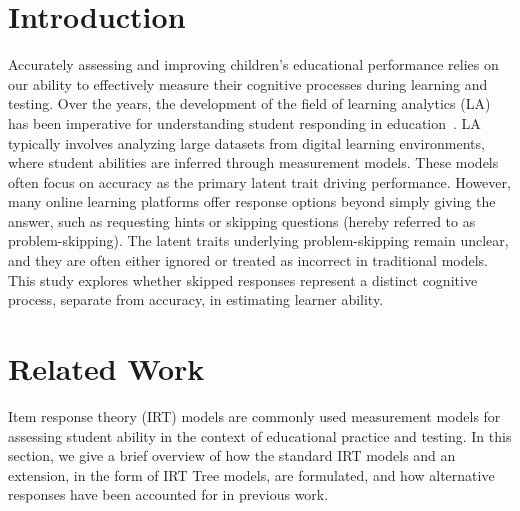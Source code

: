 \documentclass[anonymous,manuscript,review]{acmart}
\begin{document}

\maketitle



\section{Introduction}
Accurately assessing and improving children's educational performance relies on our ability to effectively measure their cognitive processes during learning and testing. Over the years, the development of the field of learning analytics (LA) has been imperative for understanding student responding in education~\cite{ye2022history}. LA typically involves analyzing large datasets from digital learning environments, where student abilities are inferred through measurement models. These models often focus on accuracy as the primary latent trait driving performance. However, many online learning platforms offer response options beyond simply giving the answer, such as requesting hints or skipping questions (hereby referred to as problem-skipping). The latent traits underlying problem-skipping remain unclear, and they are often either ignored or treated as incorrect in traditional models. This study explores whether skipped responses represent a distinct cognitive process, separate from accuracy, in estimating learner ability.

\section{Related Work}
Item response theory (IRT) models are commonly used measurement models for assessing student ability in the context of educational practice and testing. In this section, we give a brief overview of how the standard IRT models and an extension, in the form of IRT Tree models,  are formulated, and how alternative responses have been accounted for in previous work. 
\end{document}

